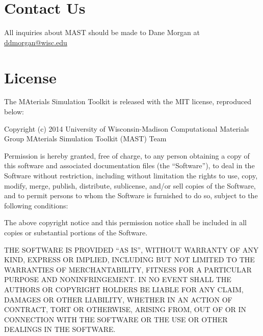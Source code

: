 \documentclass[letterpaper,10pt,english]{sphinxmanual}
\begin{document}
\chapter{Contact Us}
\label{14_0_contact:contact-us}\label{14_0_contact::doc}
All inquiries about MAST should be made to Dane Morgan at \href{mailto:ddmorgan@wisc.edu}{ddmorgan@wisc.edu}


\chapter{License}
\label{11_0_license::doc}\label{11_0_license:license}
The MAterials Simulation Toolkit is released with the MIT license, reproduced below:

Copyright (c) 2014 University of Wisconsin-Madison Computational Materials Group MAterials Simulation Toolkit (MAST) Team

Permission is hereby granted, free of charge, to any person obtaining a copy
of this software and associated documentation files (the ``Software''), to deal
in the Software without restriction, including without limitation the rights
to use, copy, modify, merge, publish, distribute, sublicense, and/or sell
copies of the Software, and to permit persons to whom the Software is
furnished to do so, subject to the following conditions:

The above copyright notice and this permission notice shall be included in
all copies or substantial portions of the Software.

THE SOFTWARE IS PROVIDED ``AS IS'', WITHOUT WARRANTY OF ANY KIND, EXPRESS OR
IMPLIED, INCLUDING BUT NOT LIMITED TO THE WARRANTIES OF MERCHANTABILITY,
FITNESS FOR A PARTICULAR PURPOSE AND NONINFRINGEMENT. IN NO EVENT SHALL THE
AUTHORS OR COPYRIGHT HOLDERS BE LIABLE FOR ANY CLAIM, DAMAGES OR OTHER
LIABILITY, WHETHER IN AN ACTION OF CONTRACT, TORT OR OTHERWISE, ARISING FROM,
OUT OF OR IN CONNECTION WITH THE SOFTWARE OR THE USE OR OTHER DEALINGS IN
THE SOFTWARE.



\renewcommand{\indexname}{Index}
\printindex
\end{document}
